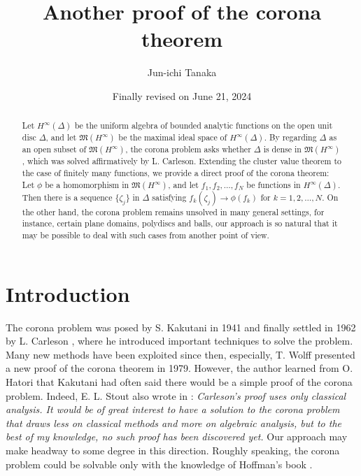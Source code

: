\documentclass[12pt]{amsart}
\title[Another proof of the corona theorem]{Another proof of the corona theorem}
\author{Jun-ichi Tanaka}
\date{Finally revised on June 21, 2024}
\theoremstyle{plain}
\numberwithin{equation}{section}
\begin{document}
\maketitle

\begin{abstract}
Let $H^\infty(\Delta)$ be the uniform algebra of
bounded analytic functions on the open unit disc
$\Delta$, and let $\mathfrak{M}(H^\infty)$
be the maximal ideal space of $H^\infty(\Delta)$.
By regarding $\Delta$ as an open subset of $\mathfrak{M}(H^\infty)$,
the corona problem asks whether $\Delta$ is dense in
$\mathfrak{M}(H^\infty)$, which was solved
affirmatively by L. Carleson. Extending the cluster value theorem
to the case of finitely many functions, we provide a direct proof
of the corona theorem:
Let $\phi$ be a homomorphism in
$\mathfrak{M}(H^\infty)$, and
let $f_1, f_2, \dots, f_N$ be functions in $H^\infty(\Delta)$. Then there is a
sequence $\{\zeta_j\}$ in $\Delta$ satisfying
$f_k(\zeta_j) \rightarrow \phi (f_k)$ for $k=1, 2, \dots, N$. On the other hand,
the corona problem remains unsolved in many general settings, for instance, certain plane domains,
polydiscs and balls, our approach is so natural that it may be possible to deal with such cases
from another point of view.

\end{abstract}

\bigskip
\bigskip
\section{Introduction}
The corona problem was posed by S. Kakutani in 1941 and
finally settled in 1962 by L. Carleson \cite{C}, where he introduced
important techniques to solve the problem.
Many new methods have been exploited since then, especially,
T. Wolff \cite{G4} presented a new proof of the corona theorem in 1979.
However, the author learned from O. Hatori that Kakutani had often
said there would be a simple proof of the corona problem.
Indeed, E. L. Stout also wrote in \cite[p 32 ]{S}: \textit{Carleson's proof uses
only classical analysis. It would be of great interest to have
a solution to the corona problem that
draws less on classical methods and more on algebraic analysis,
but to the best of my knowledge, no such proof has been discovered yet.}
Our approach may make headway to some degree in this direction. Roughly
speaking, the corona problem could be solvable only with the knowledge
of Hoffman's book \cite[Chapter 10]{H}.
\end{document}
